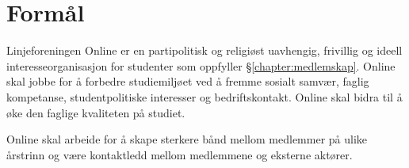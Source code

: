 \chapter{Formål}

Linjeforeningen Online er en partipolitisk og religiøst uavhengig, frivillig og ideell interesseorganisasjon for studenter som oppfyller §\ref{chapter:medlemskap}. Online skal jobbe for å forbedre studiemiljøet ved å fremme sosialt samvær, faglig kompetanse, studentpolitiske interesser og bedriftskontakt. Online skal bidra til å øke den faglige kvaliteten på studiet.

Online skal arbeide for å skape sterkere bånd mellom medlemmer på ulike årstrinn og være kontaktledd mellom medlemmene og eksterne aktører. 

